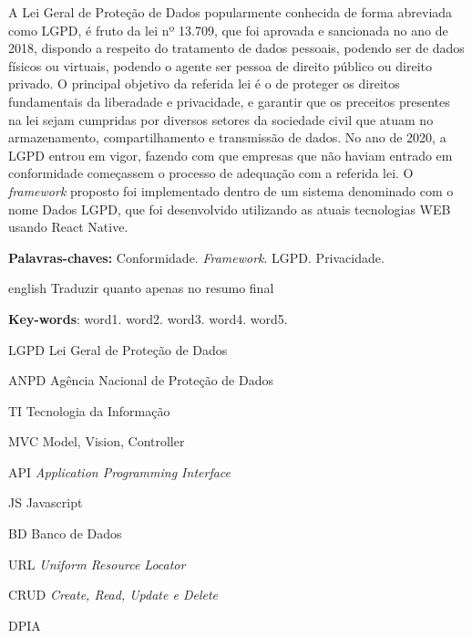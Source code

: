 \documentclass[
	12pt,				%
	openright,			%
	oneside,			%
	a4paper,			%
	english,			%
	french,				%
	spanish,			%
	brazil,				%
	]{abntex2}
\begin{document}
\begin{resumo}
\noindent
A Lei Geral de Proteção de Dados popularmente conhecida de forma abreviada como LGPD, é fruto da lei nº 13.709, que foi aprovada e sancionada no ano de 2018, dispondo a respeito do tratamento de dados pessoais, podendo ser de dados físicos ou virtuais, podendo o agente ser pessoa de direito público ou direito privado. O principal objetivo da referida lei é o de proteger os direitos fundamentais da liberadade e privacidade, e garantir que os preceitos presentes na lei sejam cumpridas por diversos setores da sociedade civil que atuam no armazenamento, compartilhamento e transmissão de dados. No ano de 2020, a LGPD entrou em vigor, fazendo com que empresas que não haviam entrado em conformidade começassem o processo de adequação com a referida lei. O \textit{framework }proposto foi implementado dentro de um sistema denominado com o nome Dados LGPD, que foi desenvolvido utilizando as atuais tecnologias WEB usando React Native.

 \vspace{\onelineskip}
    
 \noindent
 \textbf{Palavras-chaves:} Conformidade. \textit{Framework}. LGPD. Privacidade.
\end{resumo}

\begin{resumo}[Abstract]
 \begin{otherlanguage*}{english}
   \vspace{\onelineskip}
    \noindent 
Traduzir quanto apenas no resumo final
   
   \vspace{\onelineskip}
   
   \noindent  \textbf{Key-words}:  word1. word2. word3. word4. word5.
 \end{otherlanguage*}
\end{resumo}

\listoffigures*
\cleardoublepage

\listoftables*
\cleardoublepage

\begin{siglas}
    \item[LGPD] Lei Geral de Proteção de Dados
    \item[ANPD] Agência Nacional de Proteção de Dados
    \item[TI] Tecnologia da Informação
    \item[MVC] Model, Vision, Controller
    \item[API] \textit{Application Programming Interface}
    \item[JS] Javascript
    \item[BD] Banco de Dados
    \item[URL] \textit{Uniform Resource Locator}
    \item[CRUD] \textit{Create, Read, Update e Delete}
    \item[DPIA]
\end{siglas}
\end{document}
